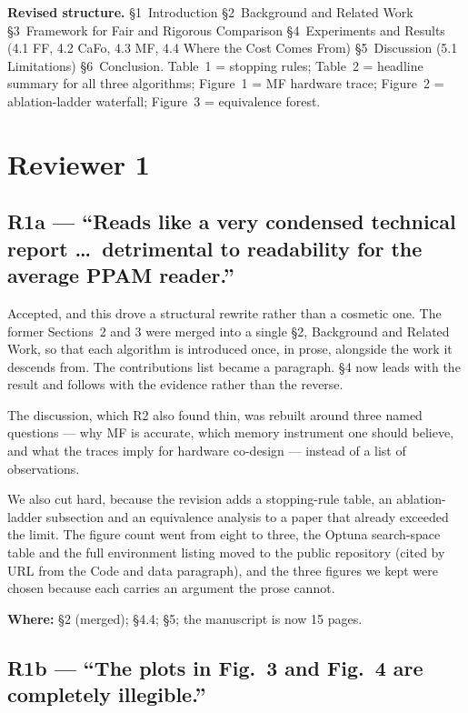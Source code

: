 \documentclass[11pt,a4paper]{article}
\newcommand{\FF}{FF}
\newcommand{\MF}{MF}
\newcommand{\CaFo}{CaFo}
\newcommand{\where}[1]{\par\smallskip\noindent\textbf{Where:} #1\par}
\begin{document}
\bigskip
\noindent\textbf{Revised structure.}
\S1~Introduction \textbar{} \S2~Background and Related Work \textbar{}
\S3~Framework for Fair and Rigorous Comparison \textbar{}
\S4~Experiments and Results (4.1 \FF{}, 4.2 \CaFo{}, 4.3 \MF{},
4.4 Where the Cost Comes From) \textbar{} \S5~Discussion (5.1 Limitations)
\textbar{} \S6~Conclusion.
Table~1 = stopping rules; Table~2 = headline summary for all three algorithms;
Figure~1 = \MF{} hardware trace; Figure~2 = ablation-ladder waterfall;
Figure~3 = equivalence forest.

\section*{Reviewer 1}

\subsection*{R1a --- ``Reads like a very condensed technical report \dots\
detrimental to readability for the average PPAM reader.''}

Accepted, and this drove a structural rewrite rather than a cosmetic one. The
former Sections~2 and 3 were merged into a single \S2, Background and Related
Work, so that each algorithm is introduced once, in prose, alongside the work
it descends from. The contributions list became a paragraph. \S4 now leads
with the result and follows with the evidence rather than the reverse.

The discussion, which R2 also found thin, was rebuilt around three named
questions --- why \MF{} is accurate, which memory instrument one should
believe, and what the traces imply for hardware co-design --- instead of a
list of observations.

We also cut hard, because the revision adds a stopping-rule table, an
ablation-ladder subsection and an equivalence analysis to a paper that already
exceeded the limit. The figure count went from eight to three, the Optuna
search-space table and the full environment listing moved to the public
repository (cited by URL from the Code and data paragraph), and the three
figures we kept were chosen because each carries an argument the prose cannot.

\where{\S2 (merged); \S4.4; \S5; the manuscript is now \num{15} pages.}

\subsection*{R1b --- ``The plots in Fig.~3 and Fig.~4 are completely
illegible.''}
\end{document}
